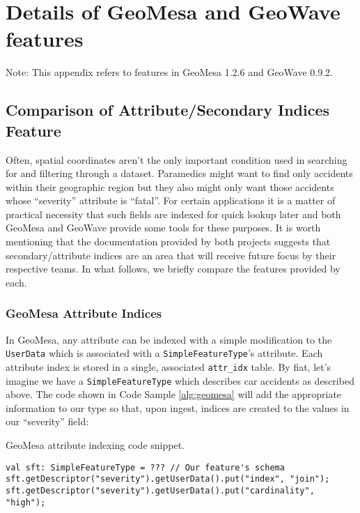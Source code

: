 \section{Details of GeoMesa and GeoWave features}
\label{appendix:features}

Note: This appendix refers to features in GeoMesa 1.2.6 and GeoWave 0.9.2.




\subsection{Comparison of Attribute/Secondary Indices Feature}
\label{appendix:features:indices}

Often, spatial coordinates aren't the only important condition used in searching for and filtering through a dataset.
Paramedics might want to find only accidents within their geographic region but they also might only want those accidents whose ``severity'' attribute is ``fatal''.
For certain applications it is a matter of practical necessity that such fields are indexed for quick lookup later and both GeoMesa and GeoWave provide some tools for these purposes.
It is worth mentioning that the documentation provided by both projects suggests that secondary/attribute indices are an area that will receive future focus by their respective teams.
In what follows, we briefly compare the features provided by each.

\subsubsection{GeoMesa Attribute Indices}

In GeoMesa, any attribute can be indexed with a simple modification to the \texttt{UserData} which is associated with a \texttt{SimpleFeatureType}'s attribute.
Each attribute index is stored in a single, associated \texttt{attr\_idx} table.
By fiat, let's imagine we have a \texttt{SimpleFeatureType} which describes car accidents as described above.
The code shown in Code Sample \ref{alg:geomesa} will add the appropriate information to our type so that, upon ingest, indices are created to the values in our ``severity'' field:

\begin{algorithm}[htb]
\caption{GeoMesa attribute indexing code snippet.}\label{alg:geomesa}
{\footnotesize\begin{lstlisting}
val sft: SimpleFeatureType = ??? // Our feature's schema
sft.getDescriptor("severity").getUserData().put("index", "join");
sft.getDescriptor("severity").getUserData().put("cardinality", "high");
\end{lstlisting}}
\end{algorithm}

